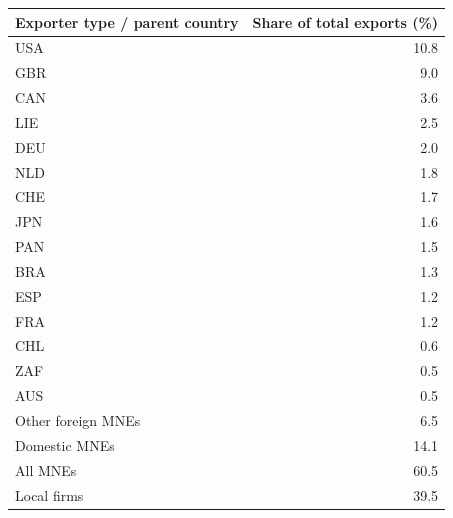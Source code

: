\begin{tabular}{lr}
\toprule
Exporter type / parent country & Share of total exports (\%) \\
\midrule
USA & 10.8 \\
GBR & 9.0 \\
CAN & 3.6 \\
LIE & 2.5 \\
DEU & 2.0 \\
NLD & 1.8 \\
CHE & 1.7 \\
JPN & 1.6 \\
PAN & 1.5 \\
BRA & 1.3 \\
ESP & 1.2 \\
FRA & 1.2 \\
CHL & 0.6 \\
ZAF & 0.5 \\
AUS & 0.5 \\
Other foreign MNEs & 6.5 \\
Domestic MNEs & 14.1 \\
\midrule
All MNEs & 60.5 \\
Local firms & 39.5 \\
\bottomrule
\end{tabular}
